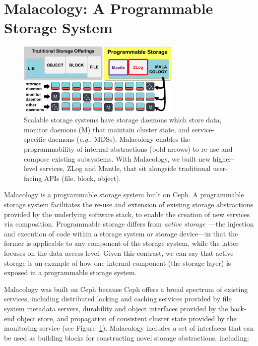 \section{Malacology: A Programmable Storage System}

\begin{figure}[tb]
\centering
\includegraphics[width=0.7\textwidth]{./chapters/background/figures/overview.png}
\caption{Scalable storage systems have storage daemons which store data,
monitor daemons (M) that maintain cluster state, and service-specific daemons
({\it e.g.}, MDSs). Malacology enables the programmability of
internal abstractions (bold arrows) to re-use and compose existing subsystems.
With Malacology, we built new higher-level services, ZLog and Mantle, that sit
alongside traditional user-facing APIs (file, block,
object).}\label{fig:overview}
\end{figure}

Malacology is a programmable storage system built on Ceph. A programmable
storage system facilitates the re-use and extension of existing storage
abstractions provided by the underlying software stack, to enable the creation
of new services via composition.  Programmable storage differs from
\emph{active storage}~\cite{riedel:vldb98}---the injection and execution of
code within a storage system or storage device---in that the former is
applicable to any component of the storage system, while the latter focuses on
the data access level. Given this contrast, we can say that active storage is
an example of how one internal component (the storage layer) is exposed in a
programmable storage system.

Malacology was built on Ceph because Ceph offers a broad spectrum of existing
services, including distributed locking and caching services provided by file
system metadata servers, durability and object interfaces provided by the
back-end object store, and propagation of consistent cluster state provided by
the monitoring service (see Figure~\ref{fig:overview}).  Malacology includes a
set of interfaces that can be used as building blocks for constructing novel
storage abstractions, including:

